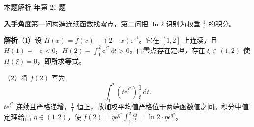 \documentclass[UTF8,zihao=-4,fontset=fandol]{ctexart}
\newenvironment{QuestionSolution}[1]{%
  \clearpage
  {\small\textcolor{black!60}{本题解析\quad #1}}\par\medskip
}{\par\clearpage}
\begin{document}
\begin{QuestionSolution}{2020 年第 20 题}
\textbf{入手角度}\quad 第一问构造连续函数找零点，第二问把 \(\ln2\) 识别为权重 \(\frac{1}{t}\) 的积分。

\textbf{解析}\quad （1）设 \(H(x)=f(x)-(2-x)\mathrm{e}^{x^2}\)。它在 \([1,2]\) 上连续，且 \(H(1)=-\mathrm{e}<0\)，\(H(2)=\int_1^2\mathrm{e}^{t^2}\,\mathrm{d}t>0\)。由零点存在定理，存在 \(\xi\in(1,2)\) 使 \(H(\xi)=0\)，即所求等式。

（2）将 \(f(2)\) 写为
\[
\int_1^2 (t \mathrm{e}^{t^2})\frac{1}{t}\,\mathrm{d}t.
\]
\(t \mathrm{e}^{t^2}\) 连续且严格递增，\(\frac{1}{t}\) 恒正，故加权平均值严格位于两端函数值之间。积分中值定理给出 \(\eta\in(1,2)\)，使 \(f(2)=\eta \mathrm{e}^{\eta^2}\int_1^2 \frac{\mathrm{d}t}{t}=\ln2\cdot\eta \mathrm{e}^{\eta^2}\)。
\end{QuestionSolution}
\end{document}
